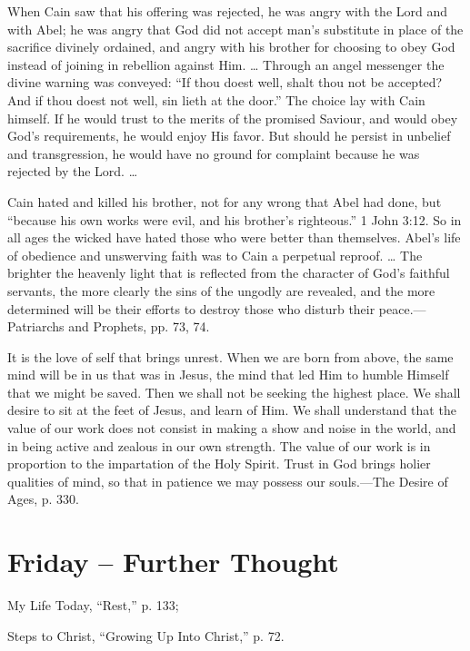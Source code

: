 \documentclass[a4paper, 10pt, twoside, headings=small]{scrartcl}
\begin{document}
\begin{multicols}{2}
When Cain saw that his offering was rejected, he was angry with the Lord and with Abel; he was angry that God did not accept man’s substitute in place of the sacrifice divinely ordained, and angry with his brother for choosing to obey God instead of joining in rebellion against Him. … Through an angel messenger the divine warning was conveyed: “If thou doest well, shalt thou not be accepted? And if thou doest not well, sin lieth at the door.” The choice lay with Cain himself. If he would trust to the merits of the promised Saviour, and would obey God’s requirements, he would enjoy His favor. But should he persist in unbelief and transgression, he would have no ground for complaint because he was rejected by the Lord. …

Cain hated and killed his brother, not for any wrong that Abel had done, but “because his own works were evil, and his brother’s righteous.” 1 John 3:12. So in all ages the wicked have hated those who were better than themselves. Abel’s life of obedience and unswerving faith was to Cain a perpetual reproof. … The brighter the heavenly light that is reflected from the character of God’s faithful servants, the more clearly the sins of the ungodly are revealed, and the more determined will be their efforts to destroy those who disturb their peace.—Patriarchs and Prophets, pp. 73, 74.

It is the love of self that brings unrest. When we are born from above, the same mind will be in us that was in Jesus, the mind that led Him to humble Himself that we might be saved. Then we shall not be seeking the highest place. We shall desire to sit at the feet of Jesus, and learn of Him. We shall understand that the value of our work does not consist in making a show and noise in the world, and in being active and zealous in our own strength. The value of our work is in proportion to the impartation of the Holy Spirit. Trust in God brings holier qualities of mind, so that in patience we may possess our souls.—The Desire of Ages, p. 330.

\section*{Friday – Further Thought}

\setlength{\parindent}{0pt}My Life Today, “Rest,” p. 133;

Steps to Christ, “Growing Up Into Christ,” p. 72.

\end{multicols}
\end{document}
